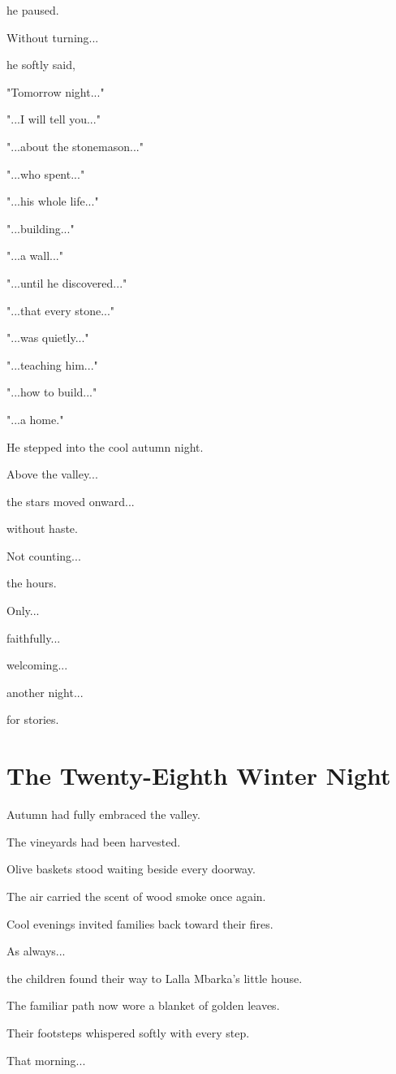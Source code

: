 \documentclass[12pt,openany]{book}
\begin{document}
he paused.

Without turning...

he softly said,

"Tomorrow night..."

"...I will tell you..."

"...about the stonemason..."

"...who spent..."

"...his whole life..."

"...building..."

"...a wall..."

"...until he discovered..."

"...that every stone..."

"...was quietly..."

"...teaching him..."

"...how to build..."

"...a home."

He stepped into the cool autumn night.

Above the valley...

the stars moved onward...

without haste.

Not counting...

the hours.

Only...

faithfully...

welcoming...

another night...

for stories.
\chapter{The Twenty-Eighth Winter Night}

Autumn had fully embraced the valley.

The vineyards had been harvested.

Olive baskets stood waiting beside every doorway.

The air carried the scent of wood smoke once again.

Cool evenings invited families back toward their fires.

As always...

the children found their way to Lalla Mbarka's little house.

The familiar path now wore a blanket of golden leaves.

Their footsteps whispered softly with every step.

That morning...
\end{document}
